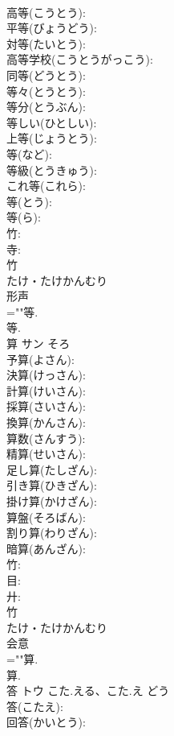 \documentclass[8pt]{extreport}
\begin{document}
\begin{CJK}{UTF8}{min}
\\	高等(こうとう): 
\\	平等(びょうどう): 
\\	対等(たいとう): 
\\	高等学校(こうとうがっこう): 
\\	同等(どうとう): 
\\	等々(とうとう): 
\\	等分(とうぶん): 
\\	等しい(ひとしい): 
\\	上等(じょうとう): 
\\	等(など): 
\\	等級(とうきゅう): 
\\	これ等(これら): 
\\	等(とう): 
\\	等(ら): 
\\	竹: 
\\	寺: 
\\	竹	
\\	たけ・たけかんむり	
\\	形声 
\\	=""等.
\\	等.
\\	算	サン	そろ		
\\	予算(よさん): 
\\	決算(けっさん): 
\\	計算(けいさん): 
\\	採算(さいさん): 
\\	換算(かんさん): 
\\	算数(さんすう): 
\\	精算(せいさん): 
\\	足し算(たしざん): 
\\	引き算(ひきざん): 
\\	掛け算(かけざん): 
\\	算盤(そろばん): 
\\	割り算(わりざん): 
\\	暗算(あんざん): 
\\	竹: 
\\	目: 
\\	廾: 
\\	竹	
\\	たけ・たけかんむり	
\\	会意 
\\	=""算.
\\	算.
\\	答	トウ	こた.える、こた.え	どう	
\\	答(こたえ): 
\\	回答(かいとう): 

\end{CJK}
\end{document}
